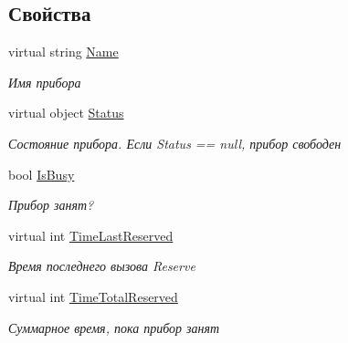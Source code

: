\subsection*{Свойства}
\begin{DoxyCompactItemize}
\item 
virtual string \hyperlink{class_s_m_p_l_sharp_1_1_objects_1_1_smpl_device_a3525605581b83649d988ca1326b4732f}{Name}
\begin{DoxyCompactList}\small\item\em Имя прибора \end{DoxyCompactList}\item 
virtual object \hyperlink{class_s_m_p_l_sharp_1_1_objects_1_1_smpl_device_a2e79fee0f480adec487fdf013ed52b2a}{Status}
\begin{DoxyCompactList}\small\item\em Состояние прибора. Если Status == null, прибор свободен \end{DoxyCompactList}\item 
bool \hyperlink{class_s_m_p_l_sharp_1_1_objects_1_1_smpl_device_a7e6939193f240d5f5642e07ef7d6b73e}{Is\-Busy}
\begin{DoxyCompactList}\small\item\em Прибор занят? \end{DoxyCompactList}\item 
virtual int \hyperlink{class_s_m_p_l_sharp_1_1_objects_1_1_smpl_device_a8757abb401c1dfa7093ced84f715a2d2}{Time\-Last\-Reserved}
\begin{DoxyCompactList}\small\item\em Время последнего вызова Reserve \end{DoxyCompactList}\item 
virtual int \hyperlink{class_s_m_p_l_sharp_1_1_objects_1_1_smpl_device_afe478b9c4ec74e462f5af5d3a51f4131}{Time\-Total\-Reserved}
\begin{DoxyCompactList}\small\item\em Суммарное время, пока прибор занят \end{DoxyCompactList}\item 

\end{DoxyCompactItemize}
